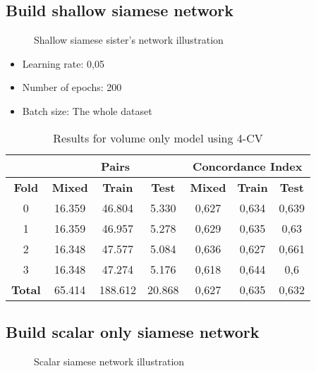 \subsection{Build shallow siamese network}
\begin{frame}{\insertsubsec}
  \begin{figure}
    \centering
    \scalebox{.7}{}
    \caption{Shallow siamese sister's network illustration \label{fig:shallow-implement}}
  \end{figure}
\end{frame}

\begin{frame}
  \begin{itemize}
    \item Learning rate: 0,05
    \item Number of epochs: 200
    \item Batch size: The whole dataset
  \end{itemize}

  \begin{table}
    \centering
    \begin{tabular}{|c||c|c|c||c|c|c|}
      \cline{2-7}
      \multicolumn{1}{c|}{} & \multicolumn{3}{|c||}{\textbf{Pairs}} & 
      \multicolumn{3}{c|}{\textbf{Concordance Index}} \\
      \hline
      \textbf{Fold} & \textbf{Mixed} & \textbf{Train} & \textbf{Test} 
      & \textbf{Mixed} & \textbf{Train} & \textbf{Test} \\
      \hhline{=======}
      0 & 16.359 & 46.804 & 5.330 & 0,627 & 0,634 & 0,639 \\
      1 & 16.359 & 46.957 & 5.278 & 0,629 & 0,635 & 0,63 \\
      2 & 16.348 & 47.577 & 5.084 & 0,636 & 0,627 & 0,661 \\
      3 & 16.348 & 47.274 & 5.176 & 0,618 & 0,644 & 0,6 \\
      \hhline{=======}
      \textbf{Total} & 65.414 & 188.612 & 20.868 & 0,627 & 0,635 & 0,632 \\
      \hline
    \end{tabular}
  
    \caption[Volume Only 4-CV results]{
      Results for volume only model using 4-CV \label{tab:results-volume-4CV}
    }
  \end{table}
\end{frame}

\subsection{Build scalar only siamese network}
\begin{frame}{\insertsubsec}
  \begin{figure}
    \centering
    
    \caption{Scalar siamese network illustration \label{fig:scalar-implement}}
  \end{figure}
\end{frame}

